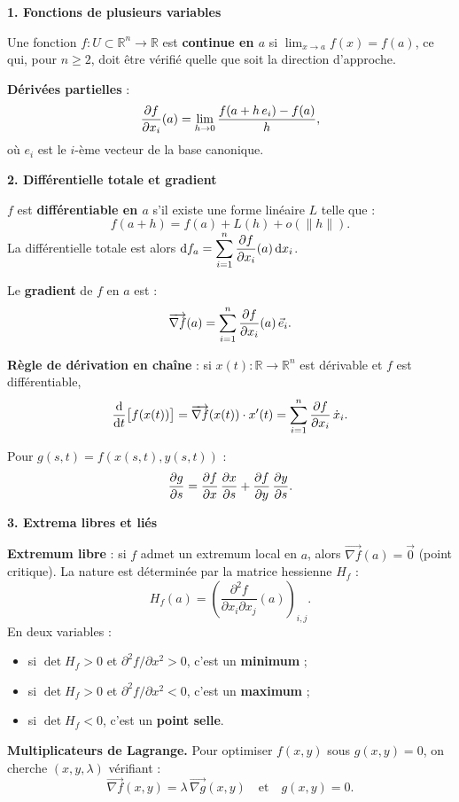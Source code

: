 \documentclass[12pt,a4paper]{article}
\begin{document}
\begin{boiteresume}
\textbf{1. Fonctions de plusieurs variables}

Une fonction $f : U \subset \mathbb{R}^n \to \mathbb{R}$ est \textbf{continue en $a$} si
$\displaystyle\lim_{x \to a} f(x) = f(a)$,
ce qui, pour $n \geq 2$, doit être vérifié quelle que soit la direction d'approche.

\textbf{Dérivées partielles} :
\[
\dfrac{\partial f}{\partial x_i}(a) = \lim_{h \to 0} \frac{f(a + h\,e_i) - f(a)}{h},
\]
où $e_i$ est le $i$-ème vecteur de la base canonique.

\medskip
\textbf{2. Différentielle totale et gradient}

$f$ est \textbf{différentiable en $a$} s'il existe une forme linéaire $L$ telle que :
\[
f(a+h) = f(a) + L(h) + o(\|h\|).
\]
La différentielle totale est alors $\mathrm{d}f_a = \displaystyle\sum_{i=1}^n \dfrac{\partial f}{\partial x_i}(a)\,\mathrm{d}x_i$.

Le \textbf{gradient} de $f$ en $a$ est :
\[
\overrightarrow{\nabla f}(a) = \sum_{i=1}^n \dfrac{\partial f}{\partial x_i}(a)\,\vec{e}_i.
\]

\textbf{Règle de dérivation en chaîne} : si $x(t) : \mathbb{R} \to \mathbb{R}^n$ est dérivable et $f$ est différentiable,
\[
\frac{\mathrm{d}}{\mathrm{d}t}\bigl[f(x(t))\bigr] = \overrightarrow{\nabla f}(x(t)) \cdot x'(t) = \sum_{i=1}^n \dfrac{\partial f}{\partial x_i}\,\dot{x}_i.
\]

Pour $g(s,t) = f(x(s,t), y(s,t))$ :
\[
\dfrac{\partial g}{\partial s} = \dfrac{\partial f}{\partial x}\,\dfrac{\partial x}{\partial s} + \dfrac{\partial f}{\partial y}\,\dfrac{\partial y}{\partial s}.
\]

\medskip
\textbf{3. Extrema libres et liés}

\textbf{Extremum libre} : si $f$ admet un extremum local en $a$, alors $\overrightarrow{\nabla f}(a) = \vec{0}$ (point critique). La nature est déterminée par la matrice hessienne $H_f$ :
\[
H_f(a) = \left(\frac{\partial^2 f}{\partial x_i \partial x_j}(a)\right)_{i,j}.
\]
En deux variables :
\begin{itemize}[nosep]
  \item si $\det H_f > 0$ et $\partial^2 f/\partial x^2 > 0$, c'est un \textbf{minimum} ;
  \item si $\det H_f > 0$ et $\partial^2 f/\partial x^2 < 0$, c'est un \textbf{maximum} ;
  \item si $\det H_f < 0$, c'est un \textbf{point selle}.
\end{itemize}

\textbf{Multiplicateurs de Lagrange.} Pour optimiser $f(x,y)$ sous $g(x,y) = 0$, on cherche $(x,y,\lambda)$ vérifiant :
\[
\overrightarrow{\nabla f}(x,y) = \lambda\,\overrightarrow{\nabla g}(x,y) \quad \text{et} \quad g(x,y) = 0.
\]


\end{boiteresume}
\end{document}
